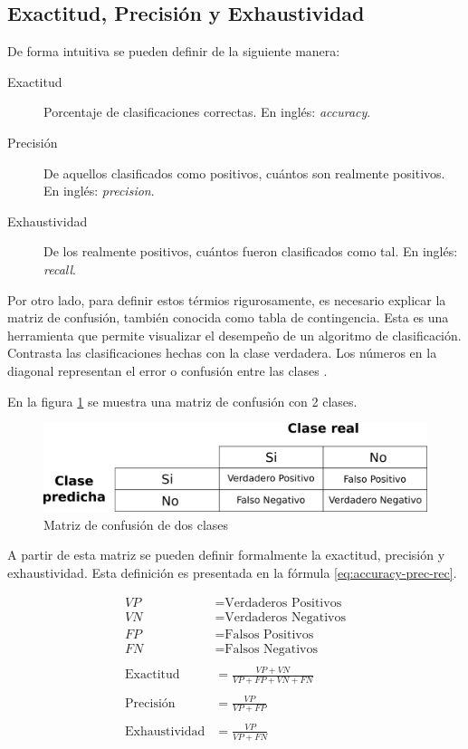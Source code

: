 \subsection{Exactitud, Precisión y Exhaustividad}

De forma intuitiva se pueden definir de la siguiente manera:

\begin{description}
	\item [Exactitud] Porcentaje de clasificaciones correctas. En inglés: \textit{accuracy}.
	\item [Precisión] De aquellos clasificados como positivos, cuántos son realmente positivos. En inglés: \textit{precision}.
	\item [Exhaustividad] De los realmente positivos, cuántos fueron clasificados como tal. En inglés: \textit{recall}.
\end{description}

Por otro lado, para definir estos térmios rigurosamente, es necesario explicar la matriz de confusión, también conocida como tabla de contingencia. Esta es una herramienta que permite visualizar el desempeño de un algoritmo de clasificación. Contrasta las clasificaciones hechas con la clase verdadera. Los números en la diagonal representan el error o confusión entre las clases \citep{fawcett2006introduction}.

En la figura \ref{fig:confussion2} se muestra una matriz de confusión con 2 clases.

\begin{figure}[htbp]
	\centering
	\includegraphics[width=0.6\linewidth]{graficos/propios/matriz_confusion.png}
	\caption{Matriz de confusión de dos clases}
	\label{fig:confussion2}
\end{figure}

A partir de esta matriz se pueden definir formalmente la exactitud, precisión y exhaustividad. Esta definición es presentada en la fórmula \ref{eq:accuracy-prec-rec}.

\begin{equation}
	\label{eq:accuracy-prec-rec}
\begin{split}
	VP &= \text{Verdaderos Positivos} \\
	VN &= \text{Verdaderos Negativos} \\
	FP &= \text{Falsos Positivos} \\
	FN &= \text{Falsos Negativos} \\\\
	\text{Exactitud} &= \frac{VP + VN}{VP + FP + VN + FN} \\\\
	\text{Precisión} &= \frac{VP}{VP + FP} \\\\
	\text{Exhaustividad} &= \frac{VP}{VP + FN}
\end{split}
\end{equation}

